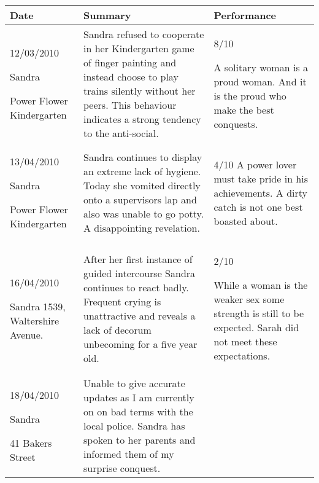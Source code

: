 \begin{longtable}{| p{} | p{} | p{} |}
\hline
\textbf{Date} & \textbf{Summary} & \textbf{Performance} \\
\hline
12/03/2010

Sandra

Power Flower Kindergarten
&
Sandra refused to cooperate in her Kindergarten game of finger painting and 
instead choose to play trains silently without her peers. This behaviour 
indicates a strong tendency to the anti-social.
&
8/10

A solitary woman is a proud woman. And it is the proud who make the best 
conquests. 
\\
\hline

13/04/2010

Sandra

Power Flower Kindergarten
 
&       

Sandra continues to display an extreme lack of hygiene. Today she vomited 
directly onto a supervisors lap and also was unable to go potty. A 
disappointing revelation.

&

4/10
A power lover must take pride in his achievements. A dirty catch is not one best 
boasted about.
\\
\hline

16/04/2010

Sandra
1539, Waltershire Avenue.
&        

After her first instance of guided intercourse Sandra continues to react badly. 
Frequent crying is unattractive and reveals a lack of decorum unbecoming for a 
five year old.
        
&

2/10

While a woman is the weaker sex some strength is still to be expected. Sarah 
did not meet these expectations.

\\
\hline

18/04/2010

Sandra

41 Bakers Street

&
  

Unable to give accurate updates as I am currently on on bad terms with the local 
police. Sandra has spoken to her parents and informed them of my surprise 
conquest.
        
&


\end{longtable}
